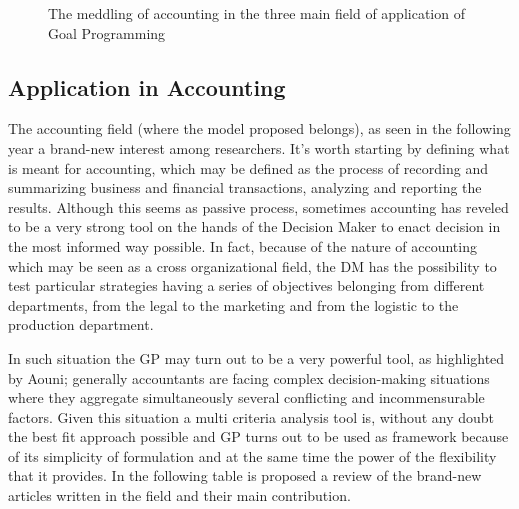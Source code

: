 \begin{doublespace}
\begin{figure}
\begin{center}
\end{center}
\caption{The meddling of accounting in the three main field of application of Goal Programming} \label{fig:accounting}
\end{figure}

\subsection{Application in Accounting}
The accounting field (where the model proposed belongs), as seen in the following year a brand-new interest among researchers. It's worth starting by defining what is meant for accounting, which may be defined as the process of recording and summarizing business and financial transactions, analyzing and reporting the results. Although this seems as passive process, sometimes accounting has reveled to be a very strong tool on the hands of the Decision Maker\cite{Davidson1961} to enact decision in the most informed way possible. In fact, because of the nature of accounting which may be seen as a cross organizational field, the DM has the possibility to test particular strategies having a series of objectives belonging from different departments, from the legal to the marketing and from the logistic to the production department.

In such situation the GP may turn out to be a very powerful tool, as highlighted by Aouni\cite{Aouni2017}; generally accountants are facing complex decision-making situations where they aggregate simultaneously several conflicting and incommensurable factors. Given this situation a multi criteria analysis tool is, without any doubt the best fit approach possible and GP turns out to be used as framework because of its simplicity of formulation and at the same time the power of the flexibility that it provides. In the following table is proposed a review of the brand-new articles written in the field and their main contribution.


\end{doublespace}
